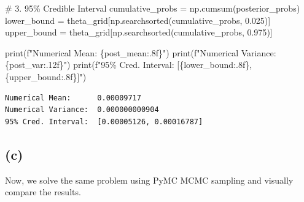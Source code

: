 \documentclass[
  letterpaper,
  DIV=11,
  numbers=noendperiod]{scrartcl}
\newenvironment{Shaded}{\begin{snugshade}}{\end{snugshade}}
\newcommand{\BuiltInTok}[1]{\textcolor[rgb]{0.00,0.23,0.31}{#1}}
\newcommand{\CommentTok}[1]{\textcolor[rgb]{0.37,0.37,0.37}{#1}}
\newcommand{\FloatTok}[1]{\textcolor[rgb]{0.68,0.00,0.00}{#1}}
\newcommand{\NormalTok}[1]{\textcolor[rgb]{0.00,0.23,0.31}{#1}}
\newcommand{\OperatorTok}[1]{\textcolor[rgb]{0.37,0.37,0.37}{#1}}
\newcommand{\SpecialCharTok}[1]{\textcolor[rgb]{0.37,0.37,0.37}{#1}}
\newcommand{\SpecialStringTok}[1]{\textcolor[rgb]{0.13,0.47,0.30}{#1}}
\begin{document}
\begin{Shaded}
\begin{Highlighting}[]
\CommentTok{\# 3. 95\% Credible Interval}
\NormalTok{cumulative\_probs }\OperatorTok{=}\NormalTok{ np.cumsum(posterior\_probs)}
\NormalTok{lower\_bound }\OperatorTok{=}\NormalTok{ theta\_grid[np.searchsorted(cumulative\_probs, }\FloatTok{0.025}\NormalTok{)]}
\NormalTok{upper\_bound }\OperatorTok{=}\NormalTok{ theta\_grid[np.searchsorted(cumulative\_probs, }\FloatTok{0.975}\NormalTok{)]}

\BuiltInTok{print}\NormalTok{(}\SpecialStringTok{f"Numerical Mean:      }\SpecialCharTok{\{}\NormalTok{post\_mean}\SpecialCharTok{:.8f\}}\SpecialStringTok{"}\NormalTok{)}
\BuiltInTok{print}\NormalTok{(}\SpecialStringTok{f"Numerical Variance:  }\SpecialCharTok{\{}\NormalTok{post\_var}\SpecialCharTok{:.12f\}}\SpecialStringTok{"}\NormalTok{)}
\BuiltInTok{print}\NormalTok{(}\SpecialStringTok{f"95\% Cred. Interval:  [}\SpecialCharTok{\{}\NormalTok{lower\_bound}\SpecialCharTok{:.8f\}}\SpecialStringTok{, }\SpecialCharTok{\{}\NormalTok{upper\_bound}\SpecialCharTok{:.8f\}}\SpecialStringTok{]"}\NormalTok{)}
\end{Highlighting}
\end{Shaded}

\begin{verbatim}
Numerical Mean:      0.00009717
Numerical Variance:  0.000000000904
95% Cred. Interval:  [0.00005126, 0.00016787]
\end{verbatim}

\subsection{(c)}\label{c-1}

Now, we solve the same problem using PyMC MCMC sampling and visually
compare the results.
\end{document}
